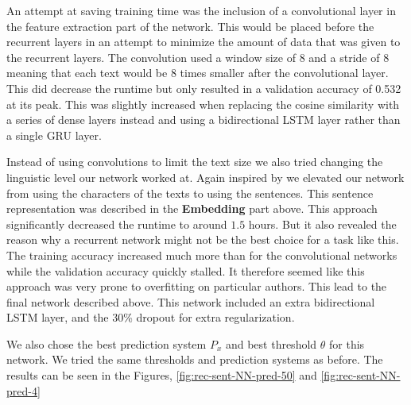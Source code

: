 An attempt at saving training time was the inclusion of a convolutional layer
in the feature extraction part of the network. This would be placed before the
recurrent layers in an attempt to minimize the amount of data that was given
to the recurrent layers. The convolution used a window size of 8 and a stride
of 8 meaning that each text would be 8 times smaller after the convolutional
layer. This did decrease the runtime but only resulted in a validation accuracy
of 0.532 at its peak. This was slightly increased when replacing the cosine
similarity with a series of dense layers instead and using a bidirectional
\gls{LSTM} layer rather than a single \gls{GRU} layer.

Instead of using convolutions to limit the text size we also tried changing
the linguistic level our network worked at. Again inspired by \cite{qian:2018}
we elevated our network from using the characters of the texts to using the
sentences. This sentence representation was described in the \textbf{Embedding}
part above. This approach significantly decreased the runtime to around $1.5$
hours. But it also revealed the reason why a recurrent network might not be
the best choice for a task like this. The training accuracy increased much
more than for the convolutional networks while the validation accuracy quickly
stalled. It therefore seemed like this approach was very prone to overfitting on
particular authors. This lead to the final network described above. This network
included an extra bidirectional \gls{LSTM} layer, and the 30\% dropout for extra
regularization.

We also chose the best prediction system $P_x$ and best threshold $\theta$ for
this network. We tried the same thresholds and prediction systems as before.
The results can be seen in the Figures, \ref{fig:rec-sent-NN-pred-50} and
\ref{fig:rec-sent-NN-pred-4}

